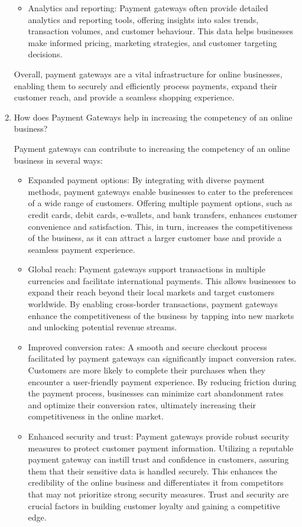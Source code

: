 \begin{enumerate}
\begin{itemize}
    \item Analytics and reporting: Payment gateways often provide detailed analytics and reporting tools, offering insights into sales trends, transaction volumes, and customer behaviour. This data helps businesses make informed pricing, marketing strategies, and customer targeting decisions.
\end{itemize}
Overall, payment gateways are a vital infrastructure for online businesses, enabling them to securely and efficiently process payments, expand their customer reach, and provide a seamless shopping experience.

 \item How does Payment Gateways help in increasing the competency of an online business?

Payment gateways can contribute to increasing the competency of an online business in several ways:
\begin{itemize}


    \item Expanded payment options: By integrating with diverse payment methods, payment gateways enable businesses to cater to the preferences of a wide range of customers. Offering multiple payment options, such as credit cards, debit cards, e-wallets, and bank transfers, enhances customer convenience and satisfaction. This, in turn, increases the competitiveness of the business, as it can attract a larger customer base and provide a seamless payment experience.

\item Global reach: Payment gateways support transactions in multiple currencies and facilitate international payments. This allows businesses to expand their reach beyond their local markets and target customers worldwide. By enabling cross-border transactions, payment gateways enhance the competitiveness of the business by tapping into new markets and unlocking potential revenue streams.

\item Improved conversion rates: A smooth and secure checkout process facilitated by payment gateways can significantly impact conversion rates. Customers are more likely to complete their purchases when they encounter a user-friendly payment experience. By reducing friction during the payment process, businesses can minimize cart abandonment rates and optimize their conversion rates, ultimately increasing their competitiveness in the online market.

\item Enhanced security and trust: Payment gateways provide robust security measures to protect customer payment information. Utilizing a reputable payment gateway can instill trust and confidence in customers, assuring them that their sensitive data is handled securely. This enhances the credibility of the online business and differentiates it from competitors that may not prioritize strong security measures. Trust and security are crucial factors in building customer loyalty and gaining a competitive edge.


\end{itemize}
\end{enumerate}
